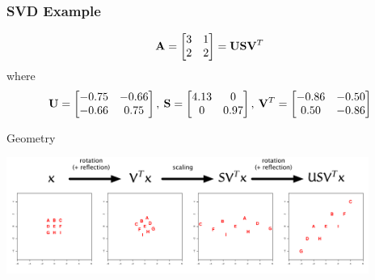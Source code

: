 \documentclass{beamer}
\begin{document}
\begin{frame}[fragile]
  \frametitle{SVD Example}

\[
\mathbf{A} =  \begin{bmatrix}3 & 1 \\ 2 & 2\end{bmatrix} = \mathbf{U} \mathbf{S} \mathbf{V}^T
\]
where
\[
\mathbf{U} = \begin{bmatrix} -0.75 & -0.66 \\ -0.66 & 0.75 \end{bmatrix}, \:
\mathbf{S} = \begin{bmatrix} 4.13 & 0 \\ 0 & 0.97 \end{bmatrix}, \:
\mathbf{V}^T = \begin{bmatrix} -0.86 & -0.50 \\ 0.50 & -0.86 \end{bmatrix}
\]

\medskip
\alert{Geometry}
\centerline{
\includegraphics[height=1.5in]{fig-svd-example}
}

\end{frame}




\end{document}
